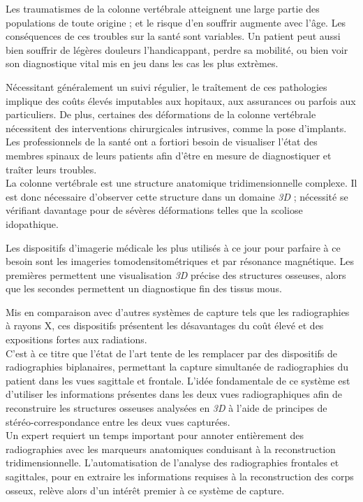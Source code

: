 Les traumatismes de la colonne vertébrale atteignent une large partie des populations de toute origine ; et le risque d'en souffrir augmente avec l'âge. Les conséquences de ces troubles sur la santé sont variables. Un patient peut aussi bien souffrir de légères douleurs l'handicappant, perdre sa mobilité, ou bien voir son diagnostique vital mis en jeu dans les cas les plus extrèmes.

Nécessitant généralement un suivi régulier, le traîtement de ces pathologies implique des coûts élevés imputables aux hopitaux, aux assurances ou parfois aux particuliers. De plus, certaines des déformations de la colonne vertébrale nécessitent des interventions chirurgicales intrusives, comme la pose d'implants. Les professionnels de la santé ont a fortiori besoin de visualiser l'état des membres spinaux de leurs patients afin d'être en mesure de diagnostiquer et traîter leurs troubles.
\\

La colonne vertébrale est une structure anatomique tridimensionnelle complexe. Il est donc nécessaire d'observer cette structure dans un domaine {\itshape 3D} ; nécessité se vérifiant davantage pour de sévères déformations telles que la scoliose idopathique.


Les dispositifs d'imagerie médicale les plus utilisés à ce jour pour parfaire à ce besoin sont les imageries tomodensitométriques et par résonance magnétique. Les premières permettent une visualisation {\itshape 3D} précise des structures osseuses, alors que les secondes permettent un diagnostique fin des tissus mous.

Mis en comparaison avec d'autres systèmes de capture tels que les radiographies à rayons X, ces dispositifs présentent les désavantages du coût élevé et des expositions fortes aux radiations.
\\

C'est à ce titre que l'état de l'art tente de les remplacer par des dispositifs de radiographies biplanaires, permettant la capture simultanée de radiographies du patient dans les vues sagittale et frontale. L'idée fondamentale de ce système est d'utiliser les informations présentes dans les deux vues radiographiques afin de reconstruire les structures osseuses analysées en {\itshape 3D} à l'aide de principes de stéréo-correspondance entre les deux vues capturées.
\\

Un expert requiert un temps important pour annoter entièrement des radiographies avec les marqueurs anatomiques conduisant à la reconstruction tridimensionnelle. L'automatisation de l'analyse des radiographies frontales et sagittales, pour en extraire les informations requises à la reconstruction des corps osseux, relève alors d'un intérêt premier à ce système de capture.

